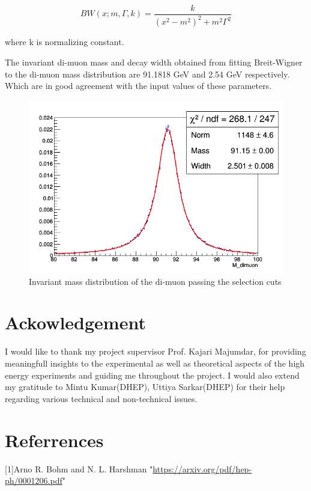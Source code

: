 \documentclass[12pt,a4paper]{article}		%
\begin{document}
	$$BW(x;m,\Gamma,k) = \frac{k}{(x^2 - m^2)^2 + m^2 \Gamma^2}$$	 

where k is normalizing constant.
 
The invariant di-muon mass and decay width obtained from fitting Breit-Wigner to the di-muon mass distribution are 91.1818 GeV and 2.54 GeV respectively. Which are in good agreement with the input values of these parameters.	

\begin{figure}[h]
	\begin{center}
		\includegraphics[scale=0.5]{m.png} 
		\caption{Invariant mass distribution of the di-muon passing the selection cuts} 					
	\end{center}
	\centering	
\end{figure}

\section{Ackowledgement}
	I would like to thank my project supervisor Prof. Kajari Majumdar, for providing meaningfull insights to the experimental as well as theoretical aspects of the high energy experiments and guiding me throughout the project. I would also extend my gratitude to Mintu Kumar(DHEP), Uttiya Sarkar(DHEP) for their help regarding various technical and non-technical issues.  
	
\section{Referrences}

  [1]Arno R. Bohm and N. L. Harshman
"\href{https://arxiv.org/pdf/hep-ph/0001206.pdf}{https://arxiv.org/pdf/hep-ph/0001206.pdf}" \\
\end{document}
